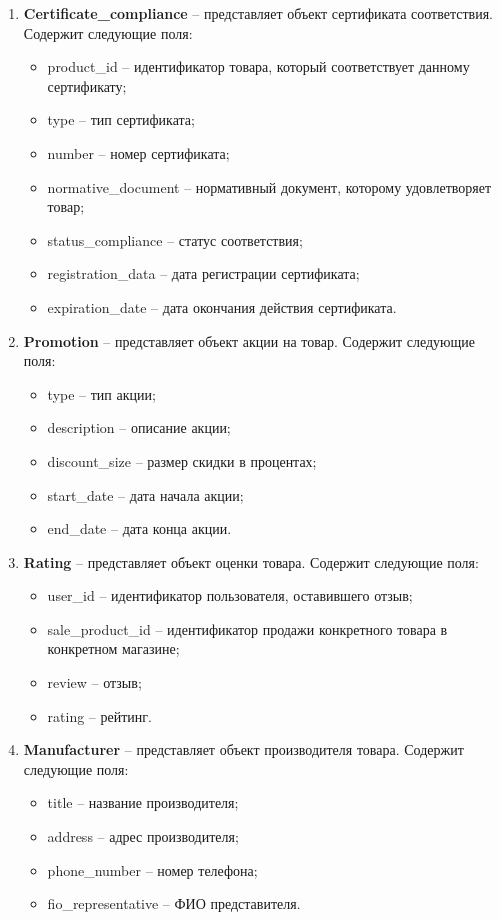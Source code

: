 \begin{enumerate}
	\item \textbf{Certificate\_compliance} -- представляет объект сертификата соответствия. Содержит следующие поля: 
	\begin{itemize}
		\item product\_id -- идентификатор товара, который соответствует данному сертификату;
		\item type -- тип сертификата;
		\item number -- номер сертификата;
		\item normative\_document -- нормативный документ, которому удовлетворяет товар;
		\item status\_compliance -- статус соответствия;
		\item registration\_data -- дата регистрации сертификата;
		\item expiration\_date -- дата окончания действия сертификата.
	\end{itemize}
	
	\item \textbf{Promotion} -- представляет объект акции на товар. Содержит следующие поля: 
	\begin{itemize}
		\item type -- тип акции;
		\item description -- описание акции;
		\item discount\_size -- размер скидки в процентах;
		\item start\_date -- дата начала акции;
		\item end\_date -- дата конца акции.
	\end{itemize}
	
	\item \textbf{Rating} -- представляет объект оценки товара. Содержит следующие поля: 
	\begin{itemize}
		\item user\_id -- идентификатор пользователя, оставившего отзыв;
		\item  sale\_product\_id -- идентификатор продажи конкретного товара в конкретном магазине;
		\item review -- отзыв;
		\item rating -- рейтинг.
	\end{itemize}
	
	\item \textbf{Manufacturer} -- представляет объект производителя товара. Содержит следующие поля: 
	\begin{itemize}
		\item title -- название производителя;
		\item address -- адрес производителя;
		\item phone\_number -- номер телефона;
		\item fio\_representative -- ФИО представителя.
	\end{itemize}
	

\end{enumerate}
